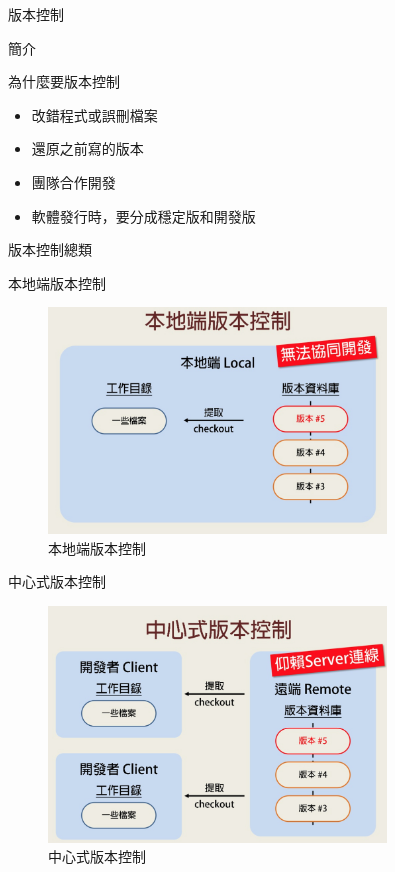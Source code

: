 \documentclass[pdf,16pt]{beamer}
\begin{document}
  \begin{section}{版本控制}
    \begin{subsection}{簡介}
      \begin{frame}{為什麼要版本控制}
        \begin{itemize}
          \item 改錯程式或誤刪檔案
          \item 還原之前寫的版本
          \item 團隊合作開發
          \item 軟體發行時，要分成穩定版和開發版
        \end{itemize}
      \end{frame}
    \end{subsection}
    
    \begin{subsection}{版本控制總類}
      \begin{frame}{本地端版本控制}
        \begin{figure}[h!]
          \includegraphics[width=0.8\textwidth]{images/001.jpg} 
          \caption{本地端版本控制}
        \end{figure}
      \end{frame}
      
      \begin{frame}{中心式版本控制}
        \begin{figure}[h!]
          \includegraphics[width=0.8\textwidth]{images/002.jpg} 
          \caption{中心式版本控制}
        \end{figure}
      \end{frame}
      

\end{subsection}
\end{section}
\end{document}
